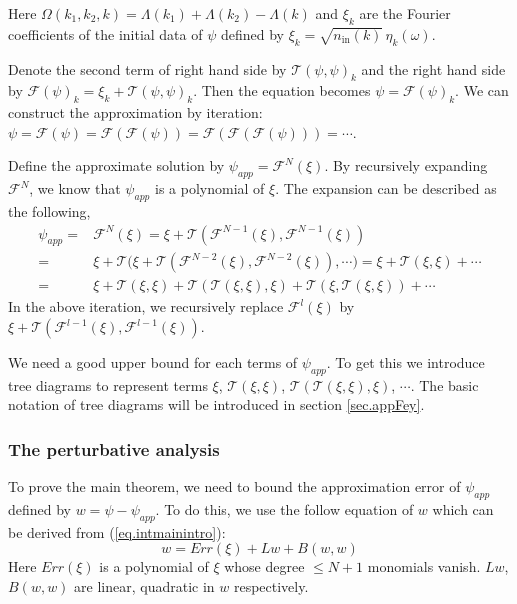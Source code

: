 Here $\Omega(k_1,k_2,k) =\Lambda(k_1)+\Lambda(k_2)-\Lambda(k)$ and $\xi_k$ are the Fourier coefficients of the initial data of $\psi$ defined by $\xi_k=\sqrt{n_{\textrm{in}}(k)} \, \eta_{k}(\omega)$.



Denote the second term of right hand side by $\mathcal{T}(\psi,\psi)_k$ and the right hand side by $\mathcal{F}(\psi)_k=\xi_k+\mathcal{T}(\psi,\psi)_k$. Then the equation becomes $\psi=\mathcal{F}(\psi)_k$. We can construct the approximation by iteration: $\psi=\mathcal{F}(\psi)=\mathcal{F}(\mathcal{F}(\psi))=\mathcal{F}(\mathcal{F}(\mathcal{F}(\psi)))=\cdots$. 

Define the approximate solution by $\psi_{app}=\mathcal{F}^{N}(\xi)$. By recursively expanding  $\mathcal{F}^{N}$, we know that $\psi_{app}$ is a polynomial of $\xi$.
The expansion can be described as the following,
\begin{equation*}
\begin{split}
    \psi_{app}=&\mathcal{F}^{N}(\xi)=\xi+\mathcal{T}(\mathcal{F}^{N-1}(\xi),\mathcal{F}^{N-1}(\xi))
    \\
    =&\xi+\mathcal{T}\Big(\xi+\mathcal{T}(\mathcal{F}^{N-2}(\xi),\mathcal{F}^{N-2}(\xi)),
    \cdots\Big)=\xi+\mathcal{T}(\xi,\xi)+\cdots
    \\
    =&\xi+\mathcal{T}(\xi,\xi)+\mathcal{T}(\mathcal{T}(\xi,\xi),\xi)
    +\mathcal{T}(\xi,\mathcal{T}(\xi,\xi))+\cdots
\end{split}    
\end{equation*}
In the above iteration, we recursively replace $\mathcal{F}^{l}(\xi)$ by $\xi+\mathcal{T}(\mathcal{F}^{l-1}(\xi),\mathcal{F}^{l-1}(\xi))$.

We need a good upper bound for each terms of $\psi_{app}$. To get this we introduce tree diagrams to represent terms $\xi$, $\mathcal{T}(\xi,\xi)$, $\mathcal{T}(\mathcal{T}(\xi,\xi),\xi)$, $\cdots$. The basic notation of tree diagrams will be introduced in section \ref{sec.appFey}.

\subsubsection{The perturbative analysis}\label{sec.pert intro} To prove the main theorem, we need to bound the approximation error of $\psi_{app}$ defined by $w=\psi-\psi_{app}$. To do this, we use the follow equation of $w$ which can be derived from (\ref{eq.intmainintro}):
\begin{equation}\label{eq.eqwintro}
    w= Err(\xi)+Lw+B(w,w)
\end{equation}
Here $Err(\xi)$ is a polynomial of $\xi$ whose degree $\le N+1$ monomials vanish. $Lw$, $B(w,w)$ are linear, quadratic in $w$ respectively.

